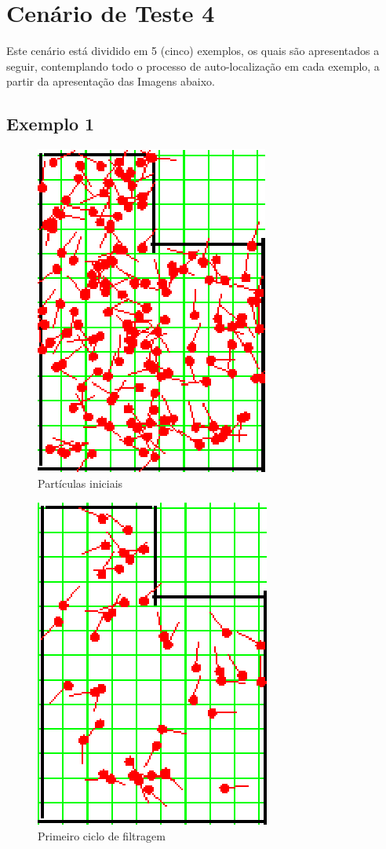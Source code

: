 \section{Cenário de Teste 4}

Este cenário está dividido em 5 (cinco) exemplos, os quais são apresentados a seguir, contemplando todo o processo de auto-localização
em cada exemplo, a partir da apresentação das Imagens abaixo.

\subsection{Exemplo 1}


\begin{figure}[H]
  \centering
  \includegraphics[scale=1]{figuras/cen4_ex1/1.eps}
  \caption[Partículas Iniciais]{Partículas iniciais}
  \label{img:cen4_ex1_1}
\end{figure}

\begin{figure}[H]
  \centering
  \includegraphics[scale=1]{figuras/cen4_ex1/2.eps}
  \caption[Primeiro Ciclo de Filtragem]{Primeiro ciclo de filtragem}
  \label{img:cen4_ex1_2}
\end{figure}

